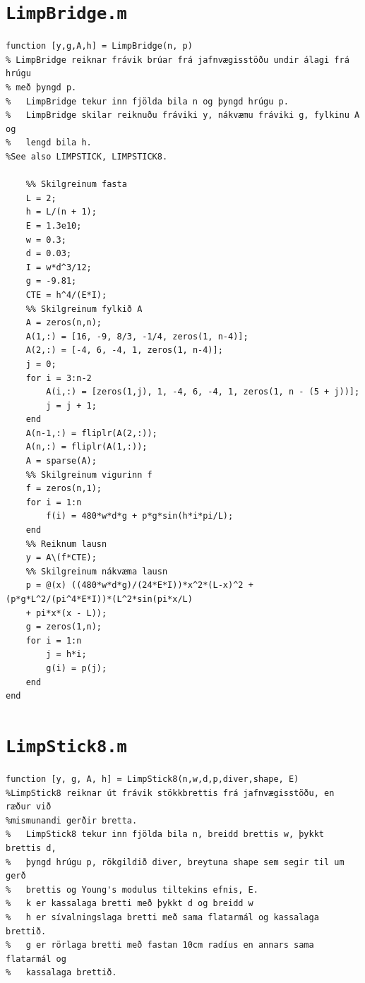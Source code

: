 \documentclass[11pt]{article}
\begin{document}
{\newpage
\section*{\texttt{LimpBridge.m}}
\begin{verbatim}
function [y,g,A,h] = LimpBridge(n, p)
% LimpBridge reiknar frávik brúar frá jafnvægisstöðu undir álagi frá hrúgu
% með þyngd p.
%   LimpBridge tekur inn fjölda bila n og þyngd hrúgu p.
%   LimpBridge skilar reiknuðu fráviki y, nákvæmu fráviki g, fylkinu A og
%   lengd bila h.
%See also LIMPSTICK, LIMPSTICK8.

    %% Skilgreinum fasta
    L = 2;
    h = L/(n + 1);
    E = 1.3e10;
    w = 0.3;
    d = 0.03;
    I = w*d^3/12;
    g = -9.81;
    CTE = h^4/(E*I);
    %% Skilgreinum fylkið A
    A = zeros(n,n);
    A(1,:) = [16, -9, 8/3, -1/4, zeros(1, n-4)];
    A(2,:) = [-4, 6, -4, 1, zeros(1, n-4)];
    j = 0;
    for i = 3:n-2
        A(i,:) = [zeros(1,j), 1, -4, 6, -4, 1, zeros(1, n - (5 + j))]; 
        j = j + 1;
    end
    A(n-1,:) = fliplr(A(2,:));
    A(n,:) = fliplr(A(1,:));
    A = sparse(A);
    %% Skilgreinum vigurinn f
    f = zeros(n,1);
    for i = 1:n
        f(i) = 480*w*d*g + p*g*sin(h*i*pi/L);
    end
    %% Reiknum lausn
    y = A\(f*CTE);
    %% Skilgreinum nákvæma lausn
    p = @(x) ((480*w*d*g)/(24*E*I))*x^2*(L-x)^2 + (p*g*L^2/(pi^4*E*I))*(L^2*sin(pi*x/L) 
    + pi*x*(x - L));
    g = zeros(1,n);
    for i = 1:n
        j = h*i;
        g(i) = p(j);
    end
end
\end{verbatim}

\newpage
\section*{\texttt{LimpStick8.m}}
\begin{verbatim}
function [y, g, A, h] = LimpStick8(n,w,d,p,diver,shape, E)
%LimpStick8 reiknar út frávik stökkbrettis frá jafnvægisstöðu, en ræður við
%mismunandi gerðir bretta.
%   LimpStick8 tekur inn fjölda bila n, breidd brettis w, þykkt brettis d,
%   þyngd hrúgu p, rökgildið diver, breytuna shape sem segir til um gerð
%   brettis og Young's modulus tiltekins efnis, E.
%   k er kassalaga bretti með þykkt d og breidd w
%   h er sívalningslaga bretti með sama flatarmál og kassalaga brettið.
%   g er rörlaga bretti með fastan 10cm radíus en annars sama flatarmál og
%   kassalaga brettið.


\end{verbatim}}
\end{document}
